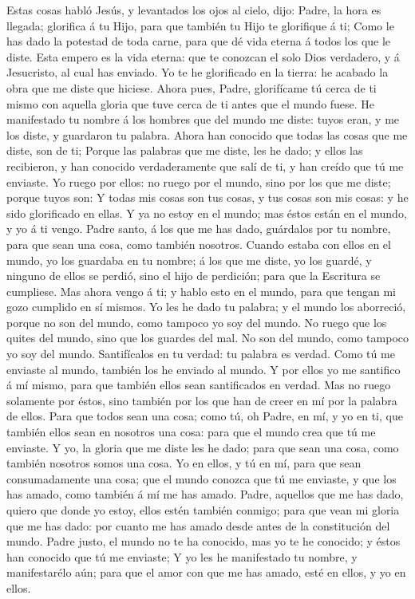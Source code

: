  Estas cosas habló Jesús, y levantados los ojos al cielo,
dijo: Padre, la hora es llegada; glorifica á tu Hijo, para que también
tu Hijo te glorifique á ti;  Como le has dado la potestad
de toda carne, para que dé vida eterna á todos los que le diste.
 Esta empero es la vida eterna: que te conozcan el solo
Dios verdadero, y á Jesucristo, al cual has enviado.  Yo
te he glorificado en la tierra: he acabado la obra que me diste que
hiciese.  Ahora pues, Padre, glorifícame tú cerca de ti
mismo con aquella gloria que tuve cerca de ti antes que el mundo fuese.
 He manifestado tu nombre á los hombres que del mundo me
diste: tuyos eran, y me los diste, y guardaron tu palabra.
 Ahora han conocido que todas las cosas que me diste, son
de ti;  Porque las palabras que me diste, les he dado; y
ellos las recibieron, y han conocido verdaderamente que salí de ti, y
han creído que tú me enviaste.  Yo ruego por ellos: no
ruego por el mundo, sino por los que me diste; porque tuyos son:
 Y todas mis cosas son tus cosas, y tus cosas son mis
cosas: y he sido glorificado en ellas.  Y ya no estoy en
el mundo; mas éstos están en el mundo, y yo á ti vengo. Padre santo, á
los que me has dado, guárdalos por tu nombre, para que sean una cosa,
como también nosotros.  Cuando estaba con ellos en el
mundo, yo los guardaba en tu nombre; á los que me diste, yo los guardé,
y ninguno de ellos se perdió, sino el hijo de perdición; para que la
Escritura se cumpliese.  Mas ahora vengo á ti; y hablo
esto en el mundo, para que tengan mi gozo cumplido en sí mismos.
 Yo les he dado tu palabra; y el mundo los aborreció,
porque no son del mundo, como tampoco yo soy del mundo. 
No ruego que los quites del mundo, sino que los guardes del mal.
 No son del mundo, como tampoco yo soy del mundo.
 Santifícalos en tu verdad: tu palabra es verdad.
 Como tú me enviaste al mundo, también los he enviado al
mundo.  Y por ellos yo me santifico á mí mismo, para que
también ellos sean santificados en verdad.  Mas no ruego
solamente por éstos, sino también por los que han de creer en mí por la
palabra de ellos.  Para que todos sean una cosa; como tú,
oh Padre, en mí, y yo en ti, que también ellos sean en nosotros una
cosa: para que el mundo crea que tú me enviaste.  Y yo,
la gloria que me diste les he dado; para que sean una cosa, como también
nosotros somos una cosa.  Yo en ellos, y tú en mí, para
que sean consumadamente una cosa; que el mundo conozca que tú me
enviaste, y que los has amado, como también á mí me has amado.
 Padre, aquellos que me has dado, quiero que donde yo
estoy, ellos estén también conmigo; para que vean mi gloria que me has
dado: por cuanto me has amado desde antes de la constitución del mundo.
 Padre justo, el mundo no te ha conocido, mas yo te he
conocido; y éstos han conocido que tú me enviaste;  Y yo
les he manifestado tu nombre, y manifestarélo aún; para que el amor con
que me has amado, esté en ellos, y yo en ellos.

